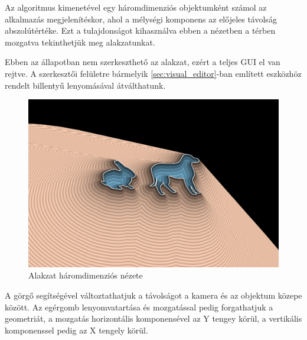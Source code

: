 Az algoritmus kimenetével egy háromdimenziós objektumként számol az alkalmazás megjelenítéskor, ahol a mélységi komponens az előjeles távolság abszolútértéke. Ezt a tulajdonságot kihasználva ebben a nézetben a térben mozgatva tekinthetjük meg alakzatunkat.

Ebben az állapotban nem szerkeszthető az alakzat, ezért a teljes GUI el van rejtve. A szerkesztői felületre bármelyik \ref{sec:visual_editor}-ban említett eszközhöz rendelt billentyű lenyomásával átválthatunk.

\begin{figure}[H]
    \centering
    \includegraphics[width=1\linewidth]{images/3d_view.png}
    \caption{Alakzat háromdimenziós nézete}
    \label{fig:3d_view-1}
\end{figure}

A görgő segítségével változtathatjuk a távolságot a kamera és az objektum közepe között. Az egérgomb lenyomvatartása és mozgatással pedig forgathatjuk a geometriát, a mozgatás horizontális komponensével az Y tengey körül, a vertikális komponenssel pedig az X tengely körül.
